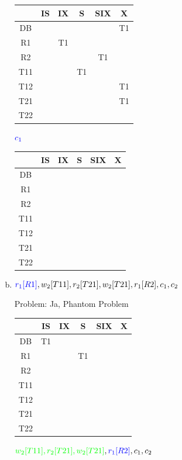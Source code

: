 \begin{note}
\begin{enumerate}[a)]
\begin{tabular}{|c|c|c|c|c|c|}
	\hline
	& IS & IX & S & SIX & X \\
	\hline
	DB &  &  &  &  & T1 \\
	\hline
	R1 &  & T1 &  &  &  \\
	\hline
	R2 &  &  &  & T1 &  \\
	\hline
	T11 &  &  & T1 &  &  \\
	\hline
	T12 &  &  &  &  & T1 \\
	\hline
	T21 &  &  &  &  & T1 \\
	\hline
	T22 &  &  &  &  &  \\
	\hline
\end{tabular}

	$\textcolor{blue}{c_1}$

\begin{tabular}{|c|c|c|c|c|c|}
	\hline
	 & IS & IX & S & SIX & X \\
	\hline
	DB &  &  &  &  &  \\
	\hline
	R1 &  &  &  &  &  \\
	\hline
	R2 &  &  &  &  &  \\
	\hline
	T11 &  &  &  &  &  \\
	\hline
	T12 &  &  &  &  &  \\
	\hline
	T21 &  &  &  &  &  \\
	\hline
	T22 &  &  &  &  &  \\
	\hline
\end{tabular}

\item $\textcolor{blue}{r_1[R1]}, w_2[T11], r_2[T21], w_2[T21], r_1[R2], c_1, c_2$

Problem: Ja, Phantom Problem

\begin{tabular}{|c|c|c|c|c|c|}
	\hline
	& IS & IX & S & SIX & X \\
	\hline
	DB & T1 &  &  &  &  \\
	\hline
	R1 &  &  & T1 &  &  \\
	\hline
	R2 &  &  &  &  &  \\
	\hline
	T11 &  &  &  &  &  \\
	\hline
	T12 &  &  &  &  &  \\
	\hline
	T21 &  &  &  &  &  \\
	\hline
	T22 &  &  &  &  &  \\
	\hline
\end{tabular}

$\textcolor{green}{w_2[T11], r_2[T21], w_2[T21]}, \textcolor{blue}{r_1[R2]}, c_1, c_2$


\end{enumerate}
\end{note}
